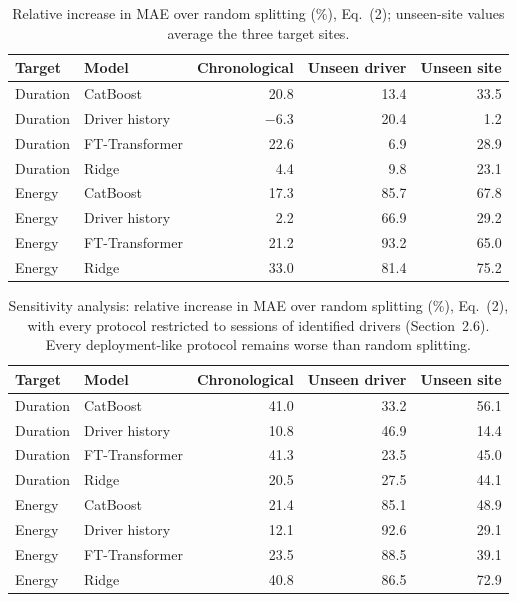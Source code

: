 \begin{table}[H]\centering\small
\caption{Relative increase in MAE over random splitting (\%), Eq.~(2); unseen-site values average the three target sites.}\label{tab:s-opt}
\begin{tabular}{llrrr}\toprule
Target & Model & Chronological & Unseen driver & Unseen site \\\midrule
Duration & CatBoost & 20.8 & 13.4 & 33.5 \\
Duration & Driver history & $-$6.3 & 20.4 & 1.2 \\
Duration & FT-Transformer & 22.6 & 6.9 & 28.9 \\
Duration & Ridge & 4.4 & 9.8 & 23.1 \\
Energy & CatBoost & 17.3 & 85.7 & 67.8 \\
Energy & Driver history & 2.2 & 66.9 & 29.2 \\
Energy & FT-Transformer & 21.2 & 93.2 & 65.0 \\
Energy & Ridge & 33.0 & 81.4 & 75.2 \\
\bottomrule\end{tabular}\end{table}

\begin{table}[H]\centering\small
\caption{Sensitivity analysis: relative increase in MAE over random splitting (\%), Eq.~(2), with every protocol restricted to sessions of identified drivers (Section~2.6). Every deployment-like protocol remains worse than random splitting.}\label{tab:s-optid}
\begin{tabular}{llrrr}\toprule
Target & Model & Chronological & Unseen driver & Unseen site \\\midrule
Duration & CatBoost & 41.0 & 33.2 & 56.1 \\
Duration & Driver history & 10.8 & 46.9 & 14.4 \\
Duration & FT-Transformer & 41.3 & 23.5 & 45.0 \\
Duration & Ridge & 20.5 & 27.5 & 44.1 \\
Energy & CatBoost & 21.4 & 85.1 & 48.9 \\
Energy & Driver history & 12.1 & 92.6 & 29.1 \\
Energy & FT-Transformer & 23.5 & 88.5 & 39.1 \\
Energy & Ridge & 40.8 & 86.5 & 72.9 \\
\bottomrule\end{tabular}\end{table}

